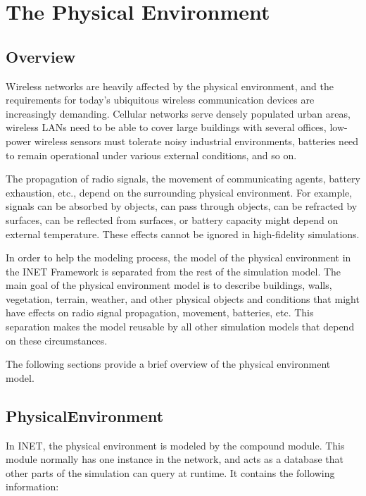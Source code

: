 \chapter{The Physical Environment}
\label{cha:environment}

\section{Overview}
\label{sec:environment:overview}

Wireless networks are heavily affected by the physical environment, and the
requirements for today's ubiquitous wireless communication devices are
increasingly demanding. Cellular networks serve densely populated urban
areas, wireless LANs need to be able to cover large buildings with several
offices, low-power wireless sensors must tolerate noisy industrial
environments, batteries need to remain operational under various external
conditions, and so on.

The propagation of radio signals, the movement of communicating agents,
battery exhaustion, etc., depend on the surrounding physical environment.
For example, signals can be absorbed by objects, can pass through objects,
can be refracted by surfaces, can be reflected from surfaces, or battery
capacity might depend on external temperature. These effects cannot
be ignored in high-fidelity simulations.

In order to help the modeling process, the model of the physical environment in
the INET Framework is separated from the rest of the simulation model. The main
goal of the physical environment model is to describe buildings, walls,
vegetation, terrain, weather, and other physical objects and conditions that
might have effects on radio signal propagation, movement, batteries, etc. This
separation makes the model reusable by all other simulation models that depend
on these circumstances.

The following sections provide a brief overview of the physical environment
model.

\section{PhysicalEnvironment}
\label{sec:environment:physicalenvironment}

In INET, the physical environment is modeled by the
 compound module. This module normally has one
instance in the network, and acts as a database that other parts of the
simulation can query at runtime. It contains the following information:

